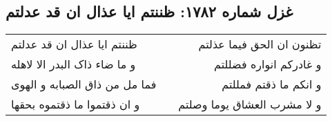 \begin{center}
\section*{غزل شماره ۱۷۸۲: ظننتم ایا عذال ان قد عدلتم}
\label{sec:1782}
\begin{longtable}{l p{0.5cm} r}
ظننتم ایا عذال ان قد عدلتم
&&
تظنون ان الحق فیما عذلتم
\\
و ما ضاء ذاک البدر الا لاهله
&&
و غادرکم انواره فضللتم
\\
فما مل من ذاق الصبابه و الهوی
&&
و انکم ما ذقتم فمللتم
\\
و ان ذقتموا ما ذقتموه بحقها
&&
و لا مشرب العشاق یوما وصلتم
\\
\end{longtable}
\end{center}
